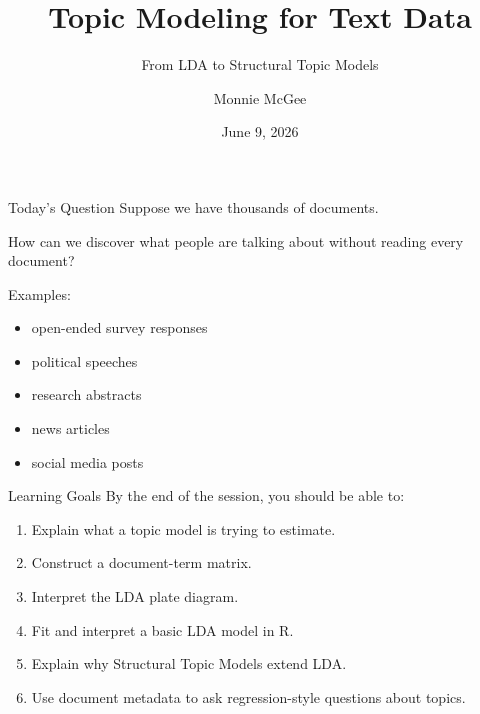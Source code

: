 \documentclass[aspectratio=169]{beamer}
\title[Topic Modeling]{Topic Modeling for Text Data}
\subtitle{From LDA to Structural Topic Models}
\author[McGee]{Monnie McGee}
\institute{REU Bootcamp}
\date{June 9, 2026}
\begin{document}
\begin{frame}
  \titlepage
\end{frame}

\begin{frame}{Today's Question}
\Large
Suppose we have thousands of documents.

\vspace{0.4cm}
How can we discover what people are talking about without reading every document?

\vspace{0.6cm}
\normalsize
Examples:
\begin{itemize}
  \item open-ended survey responses
  \item political speeches
  \item research abstracts
  \item news articles
  \item social media posts
\end{itemize}
\end{frame}

\begin{frame}{Learning Goals}
By the end of the session, you should be able to:

\begin{enumerate}
  \item Explain what a topic model is trying to estimate.
  \item Construct a document-term matrix.
  \item Interpret the LDA plate diagram.
  \item Fit and interpret a basic LDA model in R.
  \item Explain why Structural Topic Models extend LDA.
  \item Use document metadata to ask regression-style questions about topics.
\end{enumerate}
\end{frame}
\end{document}
